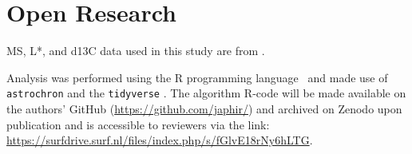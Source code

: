 \documentclass[draft]{agujournal2019}
\begin{document}


%
%

%

%



\section*{Open Research}

\Gls{MS}, \gls{L*}, and \gls{d13C} data used in this study are from .

Analysis was performed using the R programming language~\cite{RCoreTeam2024} and made use of \texttt{astrochron}  and the \texttt{tidyverse} .
The algorithm R-code will be made available on the authors' GitHub (\url{https://github.com/japhir/}) and archived on Zenodo upon publication
and is accessible to reviewers via the link: \url{https://surfdrive.surf.nl/files/index.php/s/fGlvE18rNy6hLTG}.
\end{document}
